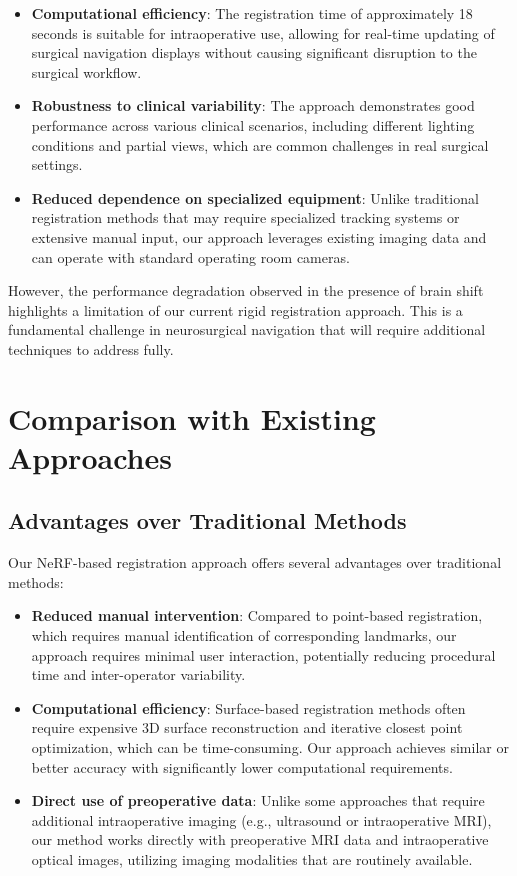 \begin{itemize}
    \item \textbf{Computational efficiency}: The registration time of approximately 18 seconds is suitable for intraoperative use, allowing for real-time updating of surgical navigation displays without causing significant disruption to the surgical workflow.
    
    \item \textbf{Robustness to clinical variability}: The approach demonstrates good performance across various clinical scenarios, including different lighting conditions and partial views, which are common challenges in real surgical settings.
    
    \item \textbf{Reduced dependence on specialized equipment}: Unlike traditional registration methods that may require specialized tracking systems or extensive manual input, our approach leverages existing imaging data and can operate with standard operating room cameras.
\end{itemize}

However, the performance degradation observed in the presence of brain shift highlights a limitation of our current rigid registration approach. This is a fundamental challenge in neurosurgical navigation that will require additional techniques to address fully.

\section{Comparison with Existing Approaches}

\subsection{Advantages over Traditional Methods}

Our NeRF-based registration approach offers several advantages over traditional methods:

\begin{itemize}
    \item \textbf{Reduced manual intervention}: Compared to point-based registration, which requires manual identification of corresponding landmarks, our approach requires minimal user interaction, potentially reducing procedural time and inter-operator variability.
    
    \item \textbf{Computational efficiency}: Surface-based registration methods often require expensive 3D surface reconstruction and iterative closest point optimization, which can be time-consuming. Our approach achieves similar or better accuracy with significantly lower computational requirements.
    
    \item \textbf{Direct use of preoperative data}: Unlike some approaches that require additional intraoperative imaging (e.g., ultrasound or intraoperative MRI), our method works directly with preoperative MRI data and intraoperative optical images, utilizing imaging modalities that are routinely available.
\end{itemize}

